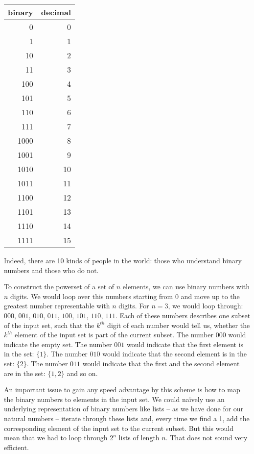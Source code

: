 \documentclass{scrreprt}
\begin{document}
\begin{center}
\begin{tabular}{r|r}
binary & decimal \\\hline\hline
0 & 0 \\
1 & 1 \\\hline
10 & 2 \\
11 & 3 \\\hline
100 & 4 \\
101 & 5 \\
110 & 6 \\
111 & 7 \\\hline
1000 & 8 \\
1001 & 9 \\
1010 & 10 \\
1011 & 11 \\
1100 & 12 \\
1101 & 13 \\
1110 & 14 \\
1111 & 15
\end{tabular} 
\end{center}

Indeed, there are 10 kinds of people in the world:
those who understand binary numbers
and those who do not.

To construct the powerset of a set of $n$ elements,
we can use binary numbers with $n$ digits.
We would loop over this numbers starting from 0
and move up to the greatest number representable
with $n$ digits. For $n = 3$, we would loop through:
$000$, $001$, $010$, $011$, $100$, $101$, $110$, $111$.
Each of these numbers describes one subset of the input set,
such that the $k^{th}$ digit of each number would tell us,
whether the $k^{th}$ element of the input set
is part of the current subset.
The number $000$ would indicate the empty set.
The number $001$ would indicate 
that the first element is in the set: $\lbrace 1\rbrace$.
The number $010$ would indicate
that the second element is in the set: $\lbrace 2\rbrace$.
The number $011$ would indicate
that the first and the second element 
are in the set: $\lbrace 1,2\rbrace$
and so on.

An important issue to gain any speed advantage
by this scheme is how to map the binary numbers
to elements in the input set.
We could na\"ively use an underlying representation
of binary numbers like lists -- 
as we have done for our natural numbers --
iterate through these lists and,
every time we find a 1,
add the corresponding element of the input set
to the current subset.
But this would mean that we had to loop
through $2^n$ lists of length $n$.
That does not sound very efficient.
\end{document}
